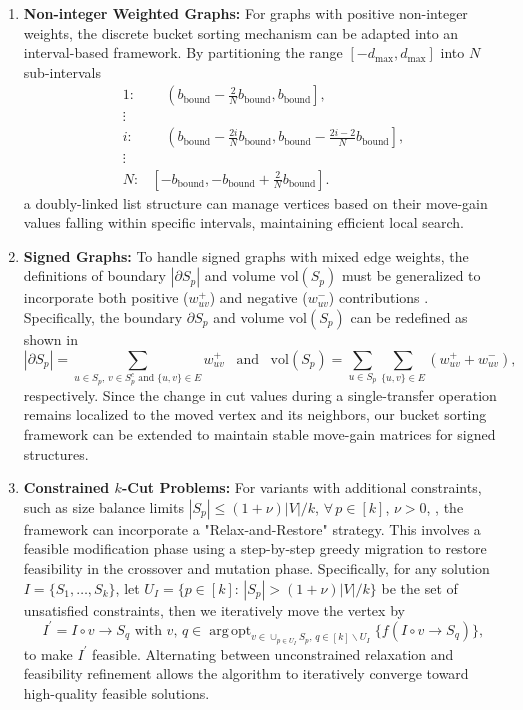 \documentclass[12pt, a4paper]{article}%
\DeclareMathOperator*{\argopt}{\ensuremath{arg\,opt}}
\newcommand{\vol}{\mathrm{vol}}
\numberwithin{equation}{section}
\theoremstyle{plain}
\begin{document}
		\begin{enumerate}
				\item \textbf{Non-integer Weighted Graphs:} For graphs with positive non-integer weights, the discrete bucket sorting mechanism can be adapted into an interval-based framework. By partitioning the range $[-d_{\max}, d_{\max}]$ into $N$ sub-intervals 	\[
				\begin{aligned}
					1:&\quad\left(b_{\text{bound}}-\frac{2}{N}b_{\text{bound}},b_{\text{bound}}\right],\\
					\vdots&\\
					i:&\quad\left(b_{\text{bound}}-\frac{2i}{N}b_{\text{bound}},b_{\text{bound}}-\frac{2i-2}{N}b_{\text{bound}}\right],\\
					\vdots&\\
					N:&\left[-b_{\text{bound}},-b_{\text{bound}}+\frac{2}{N}b_{\text{bound}}\right].
				\end{aligned}
				\] a doubly-linked list structure can manage vertices based on their move-gain values falling within specific intervals, maintaining efficient local search.				
				\item \textbf{Signed Graphs:} To handle signed graphs with mixed edge weights, the definitions of boundary $|\partial S_p|$ and volume $\vol(S_p)$ must be generalized to incorporate both positive ($w_{uv}^+$) and negative ($w_{uv}^-$) contributions \cite{chiang2012scalable}. Specifically, the boundary $\partial S_p$ and volume $\vol(S_p)$ can be redefined as shown in $$|\partial S_p|=\sum_{u\in S_p,\,v\in S_p^c\text{ and }\{u,v\}\in E}w_{uv}^+\,\,\,\text{ and }\,\,\,\vol(S_p)=\sum_{u\in S_p}\sum_{\{u,v\}\in E}(w_{uv}^++w_{uv}^-),$$ respectively. Since the change in cut values during a single-transfer operation remains localized to the moved vertex and its neighbors, our bucket sorting framework can be extended to maintain stable move-gain matrices for signed structures.				
				\item \textbf{Constrained $k$-Cut Problems:} For variants with additional constraints, such as size balance limits $|S_p| \leq (1+\nu)|V|/k$, $\forall\, p\in [k]$, $\nu>0$, \cite{bourse2014balanced}, the framework can incorporate a "Relax-and-Restore" strategy. This involves a feasible modification phase using a step-by-step greedy migration to restore feasibility in the crossover and mutation phase. Specifically, for any solution $I=\{S_1,\ldots,S_k\}$, let $U_I=\{p\in [k]:\,|S_p|> (1+\nu)|V|/k\}$ be the set of unsatisfied constraints, then we iteratively move the vertex by $$I^\prime=I\circ v\rightarrow S_q \text{ with } v,\,q\in\argopt_{v\in \cup_{p\in U_I} S_p,\,q\in [k]\backslash U_I}\{f(I\circ v\rightarrow S_q)\},$$
				to make $I^\prime$ feasible. Alternating between unconstrained relaxation and feasibility refinement allows the algorithm to iteratively converge toward high-quality feasible solutions.
			\end{enumerate}
			
\end{document}
